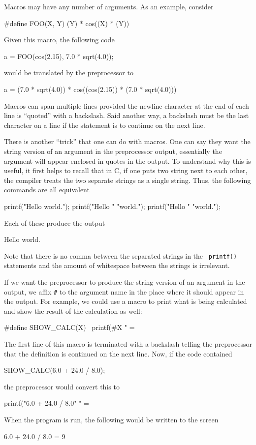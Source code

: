 Macros may have any number of arguments.  As an example, consider
\begin{code}
  #define FOO(X, Y) (Y) * cos((X) * (Y))
\end{code}
Given this macro, the following code
\begin{code}
  a = FOO(cos(2.15), 7.0 * sqrt(4.0));
\end{code}
would be translated by the preprocessor to 
\begin{code}
  a = (7.0 * sqrt(4.0)) * cos((cos(2.15)) * (7.0 * sqrt(4.0)))
\end{code}

Macros can span multiple lines provided the newline character at the
end of each line is ``quoted'' with a backslash.  Said another way, a
backslash must be the last character on a line if the statement is to
continue on the next line.

There is another ``trick'' that one can do with macros.  One can say
they want the string version of an argument in the preprocessor
output, essentially the argument will appear enclosed in quotes in the
output.  To understand why this is useful, it first helps to recall
that in C, if one puts two string next to each other, the compiler
treats the two separate strings as a single string.  Thus, the
following commands are all equivalent
\begin{code}
  printf("Hello world.\n");
  printf("Hello "  "world.\n");
  printf("Hello "
         "world.\n");
\end{code}
Each of these produce the output
\begin{code}
  Hello world.
\end{code}
Note that there is no comma between the separated strings in the {\tt
printf()} statements and the amount of whitespace between the strings
is irrelevant.

If we want the preprocessor to produce the string version of an
argument in the output, we affix {\tt \#} to the argument name in the
place where it should appear in the output.  For example, we could use
a macro to print what is being calculated and show the result of the
calculation as well:
\begin{code}
  #define SHOW_CALC(X) \
          printf(#X " = %
\end{code}
The first line of this macro is terminated with a backslash telling
the preprocessor that the definition is continued on the next line.
Now, if the code contained
\begin{code}
  SHOW_CALC(6.0 + 24.0 / 8.0);
\end{code}
the preprocessor would convert this to
\begin{code}
  printf("6.0 + 24.0 / 8.0" " = %
\end{code}
When the program is run, the following would be written to the screen
\begin{code}
  6.0 + 24.0 / 8.0 = 9
\end{code}

